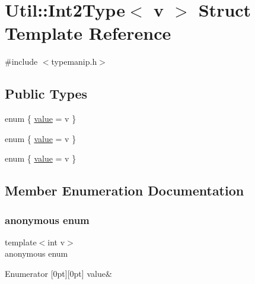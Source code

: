 \hypertarget{structUtil_1_1Int2Type}{}\section{Util\+:\+:Int2\+Type$<$ v $>$ Struct Template Reference}
\label{structUtil_1_1Int2Type}


{\ttfamily \#include $<$typemanip.\+h$>$}

\subsection*{Public Types}
\begin{DoxyCompactItemize}
\item 
enum \{ \mbox{\hyperlink{structUtil_1_1Int2Type_acf7ba88f5c3aae0ff597167617d89328a1518d2442ef74c1b5020549a8384f912}{value}} = v
 \}
\item 
enum \{ \mbox{\hyperlink{structUtil_1_1Int2Type_acf7ba88f5c3aae0ff597167617d89328a1518d2442ef74c1b5020549a8384f912}{value}} = v
 \}
\item 
enum \{ \mbox{\hyperlink{structUtil_1_1Int2Type_acf7ba88f5c3aae0ff597167617d89328a1518d2442ef74c1b5020549a8384f912}{value}} = v
 \}
\end{DoxyCompactItemize}


\subsection{Member Enumeration Documentation}
\mbox{\label{structUtil_1_1Int2Type_a0bd450c2f220057e03c1f7096674ce19}} 
\subsubsection{\texorpdfstring{anonymous enum}{anonymous enum}}
{\footnotesize\ttfamily template$<$int v$>$ \\
anonymous enum}

\begin{DoxyEnumFields}{Enumerator}
[0pt][0pt]{}\mbox{\label{structUtil_1_1Int2Type_acf7ba88f5c3aae0ff597167617d89328a1518d2442ef74c1b5020549a8384f912}} 
value&\\
\hline

\end{DoxyEnumFields}
\mbox{\label{structUtil_1_1Int2Type_ad8a2107f7e250720dbb6faf5faae5a80}} 

